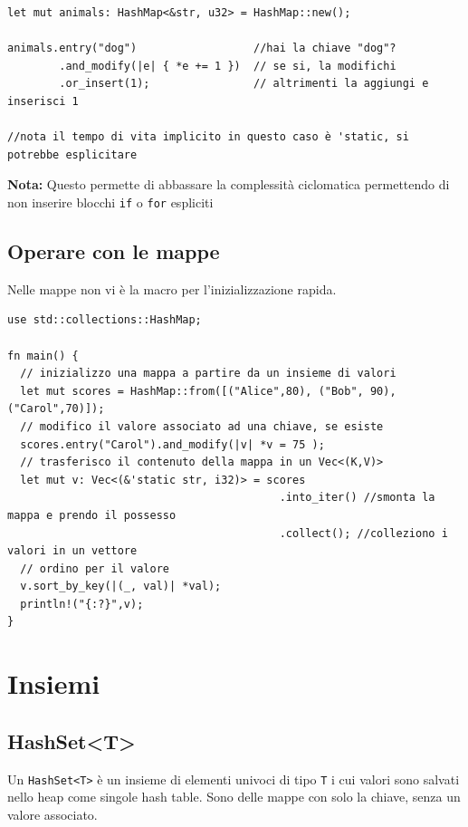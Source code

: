 \begin{verbatim}
let mut animals: HashMap<&str, u32> = HashMap::new();

animals.entry("dog")                  //hai la chiave "dog"?
        .and_modify(|e| { *e += 1 })  // se si, la modifichi
        .or_insert(1);                // altrimenti la aggiungi e inserisci 1

//nota il tempo di vita implicito in questo caso è 'static, si potrebbe esplicitare
\end{verbatim}

\begin{tcolorbox}
  \textbf{Nota:} Questo permette di abbassare la complessità ciclomatica permettendo di
  non inserire blocchi \verb|if| o \verb|for| espliciti
\end{tcolorbox}



\subsection{Operare con le mappe}

Nelle mappe non vi è la macro per l'inizializzazione rapida.

\begin{verbatim}
use std::collections::HashMap;

fn main() {
  // inizializzo una mappa a partire da un insieme di valori
  let mut scores = HashMap::from([("Alice",80), ("Bob", 90), ("Carol",70)]);
  // modifico il valore associato ad una chiave, se esiste
  scores.entry("Carol").and_modify(|v| *v = 75 );
  // trasferisco il contenuto della mappa in un Vec<(K,V)>
  let mut v: Vec<(&'static str, i32)> = scores
                                          .into_iter() //smonta la mappa e prendo il possesso
                                          .collect(); //colleziono i valori in un vettore
  // ordino per il valore
  v.sort_by_key(|(_, val)| *val);
  println!("{:?}",v);
}
\end{verbatim}


\section{Insiemi}

\subsection{HashSet<T>}

Un \texttt{HashSet<T>} è un insieme di elementi univoci di tipo \texttt{T} i cui
valori sono salvati nello heap come singole hash table. Sono delle mappe con
solo la chiave, senza un valore associato.

